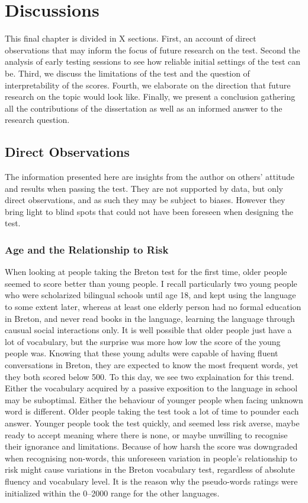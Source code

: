 \chapter{Discussions}
This final chapter is divided in X sections. First, an account of direct observations that may inform the focus of future research on the test. Second the analysis of early testing sessions to see how reliable initial settings of the test can be. Third, we discuss the limitations of the test and the question of interpretability of the scores. Fourth, we elaborate on the direction that future research on the topic would look like. Finally, we present a conclusion gathering all the contributions of the dissertation as well as an informed answer to the research question.

\section{Direct Observations}
The information presented here are insights from the author on others' attitude and results when passing the test. They are not supported by data, but only direct observations, and as such they may be subject to biases. However they bring light to blind spots that could not have been foreseen when designing the test.

\subsection{Age and the Relationship to Risk}
When looking at people taking the Breton test for the first time, older people seemed to score better than young people. I recall particularly two young people who were scholarized bilingual schools until age 18, and kept using the language to some extent later, whereas at least one elderly person had no formal education in Breton, and never read books in the language, learning the language through causual social interactions only. It is well possible that older people just have a lot of vocabulary, but the surprise was more how low the score of the young people was. Knowing that these young adults were capable of having fluent conversations in Breton, they are expected to know the most frequent words, yet they both scored below 500. To this day, we see two explaination for this trend. Either the vocabulary acquired by a passive exposition to the language in school may be suboptimal. Either the behaviour of younger people when facing unknown word is different. Older people taking the test took a lot of time to pounder each answer. Younger people took the test quickly, and seemed less risk averse, maybe ready to accept meaning where there is none, or maybe unwilling to recognise their ignorance and limitations. Because of how harsh the score was downgraded when recognising non-words, this unforeseen variation in people's relationship to risk might cause variations in the Breton vocabulary test, regardless of absolute fluency and vocabulary level. It is the reason why the pseudo-words ratings were initialized within the 0–2000 range for the other languages.

